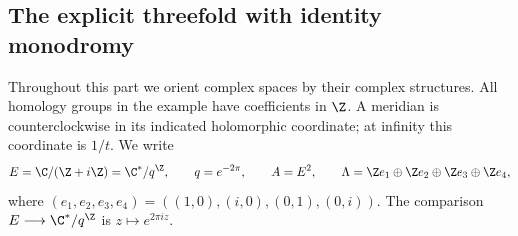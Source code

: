 \subsection{The explicit threefold with identity monodromy}

Throughout this part we orient complex spaces by their complex structures.
All homology groups in the example have coefficients in $\Z$. A meridian is
counterclockwise in its indicated holomorphic coordinate; at infinity this
coordinate is $1/t$. We write
\[
 E=\C/(\Z+i\Z)=\C^*/q^\Z,\qquad q=e^{-2\pi},\qquad
 A=E^2,\qquad \Lambda=\Z e_1\oplus\Z e_2\oplus\Z e_3\oplus\Z e_4,
\]
where $(e_1,e_2,e_3,e_4)=((1,0),(i,0),(0,1),(0,i))$. The comparison
$E\longrightarrow\C^*/q^\Z$ is $z\mapsto e^{2\pi iz}$.


